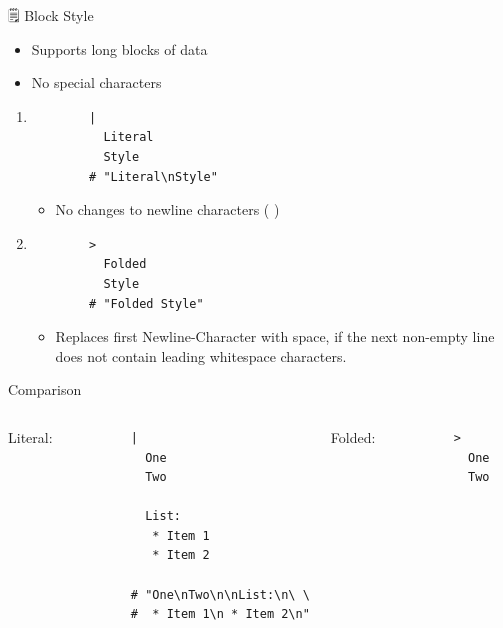 \documentclass{beamer}
\newcommand{\code}[1]{
  \codebox{\texttt|#1|}
}
\begin{document}
\begin{frame}{🗒 Block Style}

  \begin{itemize}
    \item Supports long blocks of data
    \item No special characters
  \end{itemize}

  \begin{enumerate}
    \item
      \begin{verbatim}
        |
          Literal
          Style
        # "Literal\nStyle"
      \end{verbatim}
      \begin{itemize}
        \item No changes to newline characters (\code{\n})
      \end{itemize}

    \item
      \begin{verbatim}
        >
          Folded
          Style
        # "Folded Style"
      \end{verbatim}
      \begin{itemize}
        \item Replaces first Newline-Character with space, if the next non-empty line does not contain leading whitespace characters.
    \end{itemize}

  \end{enumerate}

  \newpage
  \hspace{0pt}
  \vspace{-1cm}
  \vfill
  \begin{block}{Comparison}\
    \begin{columns}

      Literal:\\[0.2cm]
      \begin{verbatim}
        |
          One
          Two

          List:
           * Item 1
           * Item 2

        # "One\nTwo\n\nList:\n\ \
        #  * Item 1\n * Item 2\n"
      \end{verbatim}

      Folded:\\[0.2cm]
      \begin{verbatim}
        >
          One
          Two


\end{verbatim}
\end{columns}
\end{block}
\end{frame}
\end{document}
